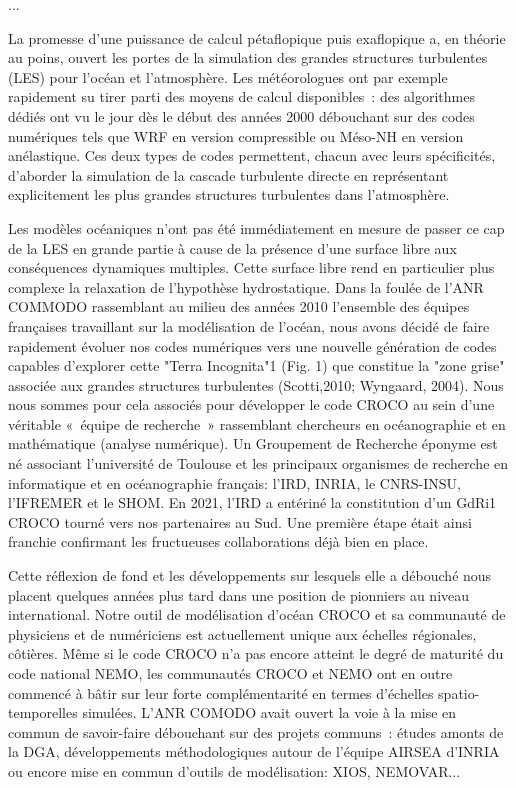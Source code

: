 ...

La promesse d’une puissance de calcul pétaflopique puis exaflopique a, en théorie au poins, ouvert les portes de la simulation des grandes structures turbulentes (LES) pour l’océan et l’atmosphère. Les météorologues ont par exemple rapidement su tirer parti des moyens de calcul disponibles : des algorithmes dédiés ont vu le jour dès le début des années 2000 débouchant sur des codes numériques tels que WRF en version compressible ou Méso-NH en version anélastique. Ces deux types de codes permettent, chacun avec leurs spécificités, d’aborder la simulation de la cascade turbulente directe en représentant explicitement les plus grandes structures turbulentes dans l’atmosphère.

Les modèles océaniques n’ont pas été immédiatement en mesure de passer ce cap de la LES en grande partie à cause de la présence d’une surface libre aux conséquences dynamiques multiples. Cette surface libre rend en particulier plus complexe la relaxation de l’hypothèse hydrostatique. Dans la foulée de l’ANR COMMODO rassemblant au milieu des années 2010 l’ensemble des équipes françaises travaillant sur la modélisation de l’océan, nous avons décidé de faire rapidement évoluer nos codes numériques vers une nouvelle génération de codes capables d'explorer cette "Terra Incognita"1 (Fig. 1) que constitue la "zone grise" associée aux grandes structures turbulentes (Scotti,2010; Wyngaard, 2004). Nous nous sommes pour cela associés pour développer le code CROCO au sein d’une véritable « équipe de recherche » rassemblant chercheurs en océanographie et en mathématique (analyse numérique). Un Groupement de Recherche éponyme est né associant l’université de Toulouse et les principaux organismes de recherche en informatique et en océanographie français: l’IRD, INRIA, le CNRS-INSU, l’IFREMER et le SHOM. En 2021, l’IRD a entériné la constitution d’un GdRi1 CROCO tourné vers nos partenaires au Sud. Une première étape était ainsi franchie confirmant les fructueuses collaborations déjà bien en place.

Cette réflexion de fond et les développements sur lesquels elle a débouché nous placent quelques années plus tard dans une position de pionniers au niveau international. Notre outil de modélisation d’océan CROCO et sa communauté de physiciens et de numériciens est actuellement unique aux échelles régionales, côtières. Même si le code CROCO n’a pas encore atteint le degré de maturité du code national NEMO, les communautés CROCO et NEMO ont en outre commencé à bâtir sur leur forte complémentarité en termes d’échelles spatio-temporelles simulées. L’ANR COMODO avait ouvert la voie à la mise en commun de savoir-faire débouchant sur des projets communs : études amonts de la DGA, développements méthodologiques autour de l’équipe AIRSEA d’INRIA ou encore mise en commun d’outils de modélisation: XIOS, NEMOVAR...

